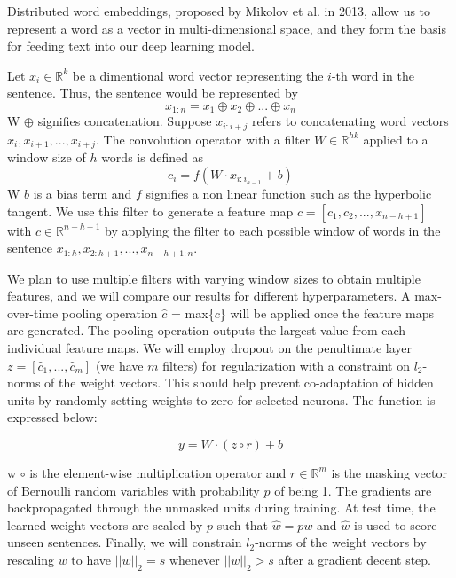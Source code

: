 \documentclass[conference]{IEEEtran}
\begin{document}
    Distributed word embeddings, proposed by Mikolov et al.
    in 2013\cite{word2vec}, allow us to represent a word as a vector in
    multi-dimensional space, and they form the basis for feeding text into our deep
    learning model.

    Let $x_{i} \in \mathbb{R}^k$ be a dimentional word vector representing the $i$-th word in the
    sentence. Thus, the sentence would be represented by
    \begin{equation}
    x_{1:n} = x_1 \oplus x_2 \oplus ... \oplus x_n
    \end{equation}
    W $\oplus$ signifies concatenation. Suppose $x_{i:i+j}$ refers to concatenating
    word vectors $x_i, x_{i+1}, ... , x_{i+j}$. The convolution operator with a filter
    $W \in \mathbb{R}^{hk}$ applied to a window size of $h$
    words is defined as
    \begin{equation}
    c_i = f(W \cdot x_{i:i_{h-1}} + b)
    \end{equation}
    W $b$ is a bias term and $f$ signifies a non linear function such as the hyperbolic
    tangent. We use this filter to generate a feature map $c = [c_1, c_2, ... ,x_{n-h+1}]$
    with $c \in \mathbb{R}^{n-h+1}$ by applying the filter to each possible window of words in
    the sentence $x_{1:h}, x_{2:h+1}, ... ,x_{n-h+1:n}$.

    We plan to use multiple filters with varying window sizes to obtain multiple features, and we will
    compare our results for different hyperparameters.
    A max-over-time pooling operation $\hat{c}$ = max\{$c$\} will be applied once the feature
    maps are generated. The pooling operation outputs the largest value from each individual
    feature maps. We will employ dropout on the penultimate layer $z = [\hat{c}_1,...,\hat{c}_m]$
    (we have $m$ filters) for regularization with a constraint on $l_2$-norms of the weight
    vectors. This should help prevent co-adaptation of hidden units by randomly setting weights
    to zero for selected neurons. The function is expressed below:

    \begin{equation}
    y = W \cdot (z \circ r) + b
    \end{equation}

    w $\circ$ is the element-wise multiplication operator and $r \in \mathbb{R}^m$ is
    the masking vector of Bernoulli random variables with probability $p$ of being 1.
    The gradients are backpropagated through the unmasked units during training. At test
    time, the learned weight vectors are scaled by $p$ such that $\hat{w} = pw$ and $\hat{w}$
    is used to score unseen sentences. Finally, we will constrain $l_2$-norms of the weight
    vectors by rescaling $w$ to have $||w||_2 = s$ whenever $||w||_2 > s$ after a gradient
    decent step.
\end{document}
